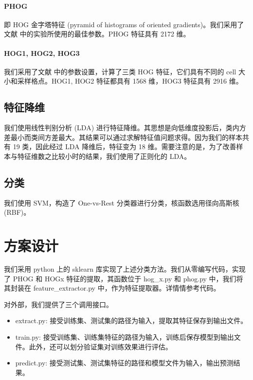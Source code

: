 \documentclass{report}
\begin{document}
\paragraph{PHOG}
即 HOG 金字塔特征 (pyramid of histograms of oriented gradients)。我们采用了文献 \cite{Digit} 中的实验所使用的最佳参数。PHOG 特征具有 2172 维。

\paragraph{HOG1, HOG2, HOG3}
我们采用了文献 \cite{GTSRB} 中的参数设置，计算了三类 HOG 特征，它们具有不同的 cell 大小和采样格点。HOG1, HOG2 特征都具有 1568 维，HOG3 特征具有 2916 维。

\subsection{特征降维}

我们使用线性判别分析 (LDA) 进行特征降维。其思想是向低维度投影后，类内方差最小而类间方差最大。其结果可以通过求解特征值问题求得。因为我们的样本共有 19 类，因此经过 LDA 降维后，特征变为 18 维。需要注意的是，为了改善样本与特征维数之比较小时的结果，我们使用了正则化的 LDA。

\subsection{分类}

我们使用 SVM，构造了 One-vs-Rest 分类器进行分类，核函数选用径向高斯核 (RBF)。

\section{方案设计}

我们采用 python 上的 sklearn 库实现了上述分类方法。我们从零编写代码，实现了 PHOG 和 HOGx 特征的提取，其函数位于 hog\_x.py 和 phog.py 中，我们将其封装在 feature\_extractor.py 中，作为特征提取器。详情情参考代码。

对外部，我们提供了三个调用接口。

\begin{itemize}
  \item extract.py: 接受训练集、测试集的路径为输入，提取其特征保存到输出文件。
  \item train.py: 接受训练集、训练集特征的路径为输入，训练后保存模型到输出文件。此外，还可以划分验证集对训练效果进行评估。
  \item predict.py: 接受测试集、测试集特征的路径和模型文件为输入，输出预测结果。
\end{itemize}
\end{document}
